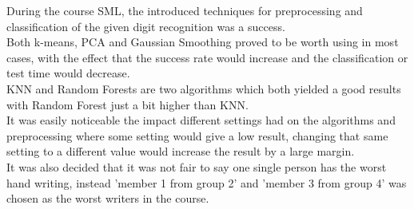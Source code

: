 \documentclass[report]{subfiles}
\begin{document}
During the course SML, the introduced techniques for preprocessing and classification of the given digit recognition was a success.\\
Both k-means, PCA and Gaussian Smoothing proved to be worth using in most cases, with the effect that the success rate would increase and the classification or test time would decrease.\\ 
KNN and Random Forests are two algorithms which both yielded a good results with Random Forest just a bit higher than KNN.\\
It was easily noticeable the impact different settings had on the algorithms and preprocessing where some setting would give a low result, changing that same setting to a different value would increase the result by a large margin.\\It was also decided that it was not fair to say one single person has the worst hand writing, instead 'member 1 from group 2' and 'member 3 from group 4' was chosen as the worst writers in the course.
\end{document}
